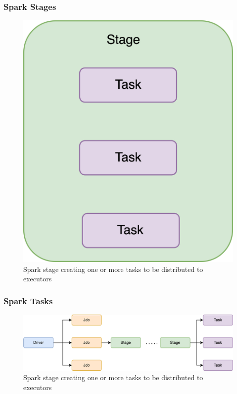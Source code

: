 \begin{frame}
    \frametitle{Spark Stages}
    \begin{figure}
        \includegraphics[width=\textwidth,height=.7\textheight,keepaspectratio]{./Figures/chapter-04/Spark_Stage}
        \caption{Spark stage creating one or more tasks to be distributed to executors}\label{fig:spark_stage}
    \end{figure}
\end{frame}
\begin{frame}
    \frametitle{Spark Tasks}
    \begin{figure}
        \includegraphics[width=\textwidth,height=.7\textheight,keepaspectratio]{./Figures/chapter-04/Spark_tasks}
        \caption{Spark stage creating one or more tasks to be distributed to executors}\label{fig:Spark_tasks}
    \end{figure}
\end{frame}

